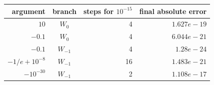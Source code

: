 \begin{tabular}{@{}rcrr@{}}
\toprule
argument & branch & steps for $10^{-15}$ & final absolute error \\
\midrule
$10$ & $W_0$ & 4 & $1.627e-19$ \\
$-0.1$ & $W_0$ & 4 & $6.044e-21$ \\
$-0.1$ & $W_{-1}$ & 4 & $1.28e-24$ \\
$-1/e+10^{-8}$ & $W_{-1}$ & 16 & $1.483e-21$ \\
$-10^{-30}$ & $W_{-1}$ & 2 & $1.108e-17$ \\
\bottomrule
\end{tabular}
